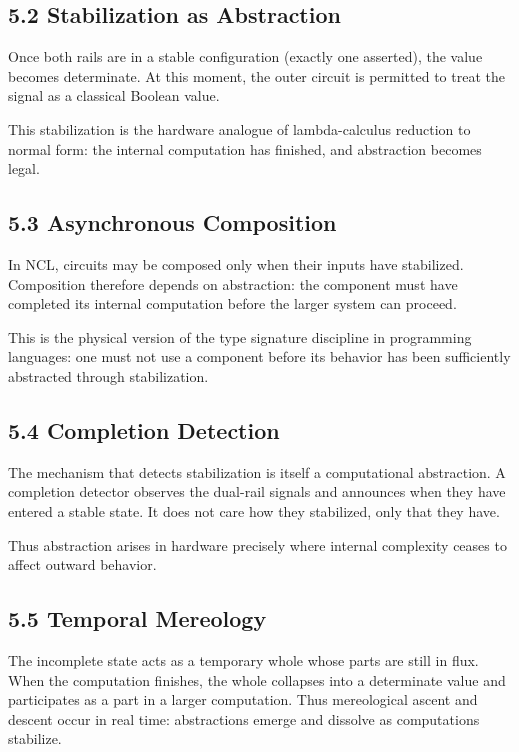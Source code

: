 \documentclass[11pt,letterpaper]{article}
\begin{document}
\subsection{5.2 Stabilization as Abstraction}

Once both rails are in a stable configuration (exactly one asserted), the value becomes determinate. At this moment, the outer circuit is permitted to treat the signal as a classical Boolean value.

This stabilization is the hardware analogue of lambda-calculus reduction to normal form: the internal computation has finished, and abstraction becomes legal.

\subsection{5.3 Asynchronous Composition}

In NCL, circuits may be composed only when their inputs have stabilized. Composition therefore depends on abstraction: the component must have completed its internal computation before the larger system can proceed.

This is the physical version of the type signature discipline in programming languages: one must not use a component before its behavior has been sufficiently abstracted through stabilization.

\subsection{5.4 Completion Detection}

The mechanism that detects stabilization is itself a computational abstraction. A completion detector observes the dual-rail signals and announces when they have entered a stable state. It does not care how they stabilized, only that they have.

Thus abstraction arises in hardware precisely where internal complexity ceases to affect outward behavior.

\subsection{5.5 Temporal Mereology}

The incomplete state acts as a temporary whole whose parts are still in flux. When the computation finishes, the whole collapses into a determinate value and participates as a part in a larger computation. Thus mereological ascent and descent occur in real time: abstractions emerge and dissolve as computations stabilize.
\end{document}
